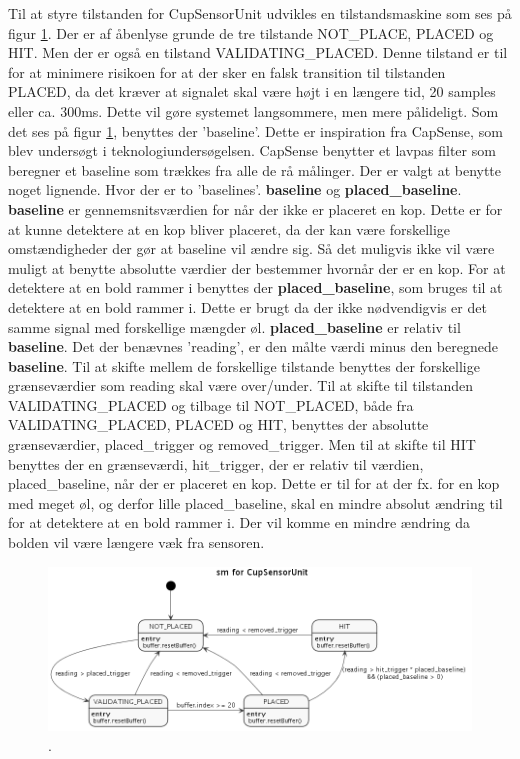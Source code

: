 \documentclass[Softwaredesign/Softwaredesign_main.tex]{subfiles}
\begin{document}
Til at styre tilstanden for CupSensorUnit udvikles en tilstandsmaskine som ses på figur \ref{fig:CupSensor-IF-state}. Der er af åbenlyse grunde de tre tilstande NOT\_PLACE, PLACED og HIT. Men der er også en tilstand VALIDATING\_PLACED. Denne tilstand er til for at minimere risikoen for at der sker en falsk transition til tilstanden PLACED, da det kræver at signalet skal være højt i en længere tid, 20 samples eller ca. 300ms. Dette vil gøre systemet langsommere, men mere pålideligt. Som det ses på figur \ref{fig:CupSensor-IF-state}, benyttes der 'baseline'. Dette er inspiration fra CapSense, som blev undersøgt i teknologiundersøgelsen. CapSense benytter et lavpas filter som beregner et baseline som trækkes fra alle de rå målinger. Der er valgt at benytte noget lignende. Hvor der er to 'baselines'. \textbf{baseline} og \textbf{placed\_baseline}. \textbf{baseline} er gennemsnitsværdien for når der ikke er placeret en kop. Dette er for at kunne detektere at en kop bliver placeret, da der kan være forskellige omstændigheder der gør at baseline vil ændre sig. Så det muligvis ikke vil være muligt at benytte absolutte værdier der bestemmer hvornår der er en kop. For at detektere at en bold rammer i benyttes der \textbf{placed\_baseline}, som bruges til at detektere at en bold rammer i. Dette er brugt da der ikke nødvendigvis er det samme signal med forskellige mængder øl. \textbf{placed\_baseline} er relativ til \textbf{baseline}. Det der benævnes 'reading', er den målte værdi minus den beregnede \textbf{baseline}. Til at skifte mellem de forskellige tilstande benyttes der forskellige grænseværdier som reading skal være over/under. Til at skifte til tilstanden VALIDATING\_PLACED og tilbage til NOT\_PLACED, både fra VALIDATING\_PLACED, PLACED og HIT, benyttes der absolutte grænseværdier, placed\_trigger og removed\_trigger. Men til at skifte til HIT benyttes der en grænseværdi, hit\_trigger, der er relativ til værdien, placed\_baseline, når der er placeret en kop. Dette er til for at der fx. for en kop med meget øl, og derfor lille placed\_baseline, skal en mindre absolut ændring til for at detektere at en bold rammer i. Der vil komme en mindre ændring da bolden vil være længere væk fra sensoren.
\begin{figure}[H]
    \centering
    \includegraphics[width=1\textwidth]{Softwaredesign/CupSensor_IF/graphics/state.png}
    \caption{.}
    \label{fig:CupSensor-IF-state}
\end{figure}
\end{document}
